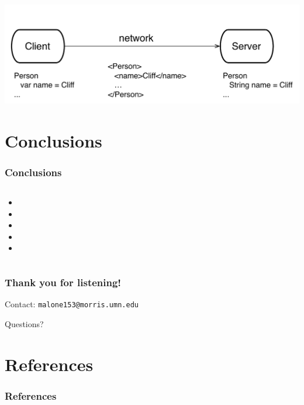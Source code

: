 \documentclass{beamer}
\newcommand{\linespace}{\vskip 0.25cm}
\begin{document}
 \begin{frame}
 \includegraphics[scale=0.6]{graphics/ClientServer.pdf}
 
 
 \end{frame}

\section[Conclusions]{Conclusions}

\begin{frame}
  \frametitle{Conclusions}
  
  \begin{columns}
  \begin{column}{0.6\textwidth}
  \begin{itemize}
  	\item 
	\item 
	\item 
	\item 
	\item 
  \end{itemize}
  \end{column}
  \end{columns}
\end{frame}




\begin{frame}
	\frametitle{Thank you for listening!}
	
	
		
	\linespace
	\linespace
	
	Contact:  
		\texttt{malone153@morris.umn.edu}
	
	\linespace
	\linespace
	
	\begin{center}
	{\huge Questions?}
	\end{center}
\end{frame}

\section*{References}

\begin{frame} 
	\frametitle{References} 
	
	
	
	
\end{frame} 
\end{document}
